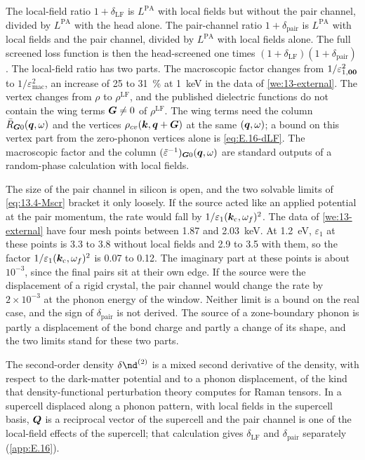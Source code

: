 The local-field ratio $1 + \delta_{\mathrm{LF}}$ is $L^{\mathrm{PA}}$ with local fields but without the pair channel, divided by $L^{\mathrm{PA}}$ with the head alone. The pair-channel ratio $1 + \delta_{\mathrm{pair}}$ is $L^{\mathrm{PA}}$ with local fields and the pair channel, divided by $L^{\mathrm{PA}}$ with local fields alone. The full screened loss function is then the head-screened one times $(1 + \delta_{\mathrm{LF}})(1 + \delta_{\mathrm{pair}})$. The local-field ratio has two parts. The macroscopic factor changes from $1/\varepsilon_{1,\bm{0}\bm{0}}^2$ to $1/\varepsilon_{\mathrm{mac}}^2$, an increase of 25 to \SI{31}{\percent} at \SI{1}{keV} in the data of \cref{we:13-external}. The vertex changes from $\rho$ to $\rho^{\mathrm{LF}}$, and the published dielectric functions do not contain the wing terms $\bm{G} \neq 0$ of $\rho^{\mathrm{LF}}$. The wing terms need the column $\bar R_{\bm{G}0}(\bm{q},\omega)$ and the vertices $\rho_{cv}(\bm{k},\bm{q}+\bm{G})$ at the same $(\bm{q},\omega)$; a bound on this vertex part from the zero-phonon vertices alone is \cref{eq:E.16-dLF}. The macroscopic factor and the column $(\tilde\varepsilon^{-1})_{\bm{G}0}(\bm{q},\omega)$ are standard outputs of a random-phase calculation with local fields.

The size of the pair channel in silicon is open, and the two solvable limits of \cref{eq:13.4-Mscr} bracket it only loosely. If the source acted like an applied potential at the pair momentum, the rate would fall by $1/\varepsilon_1(\bm{k}_{\mathrm{c}},\omega_f)^2$. The data of \cref{we:13-external} have four mesh points between 1.87 and \SI{2.03}{keV}. At \SI{1.2}{eV}, $\varepsilon_1$ at these points is 3.3 to 3.8 without local fields and 2.9 to 3.5 with them, so the factor $1/\varepsilon_1(\bm{k}_{\mathrm{c}},\omega_f)^2$ is 0.07 to 0.12. The imaginary part at these points is about $10^{-3}$, since the final pairs sit at their own edge. If the source were the displacement of a rigid crystal, the pair channel would change the rate by $2\times10^{-3}$ at the phonon energy of the window. Neither limit is a bound on the real case, and the sign of $\delta_{\mathrm{pair}}$ is not derived. The source of a zone-boundary phonon is partly a displacement of the bond charge and partly a change of its shape, and the two limits stand for these two parts.

The second-order density $\delta\nd^{(2)}$ is a mixed second derivative of the density, with respect to the dark-matter potential and to a phonon displacement, of the kind that density-functional perturbation theory computes for Raman tensors. In a supercell displaced along a phonon pattern, with local fields in the supercell basis, $\bm{Q}$ is a reciprocal vector of the supercell and the pair channel is one of the local-field effects of the supercell; that calculation gives $\delta_{\mathrm{LF}}$ and $\delta_{\mathrm{pair}}$ separately (\cref{app:E.16}).

